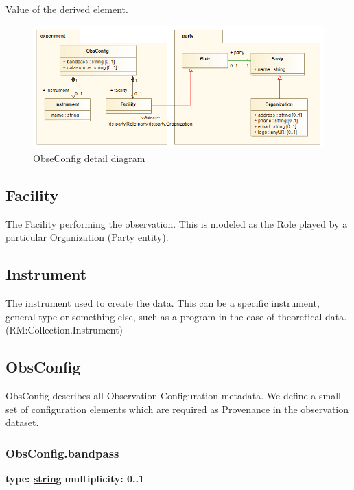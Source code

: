   Value of the derived element.

\pagebreak
\begin{figure}[h]
\begin{center}
  \includegraphics[width=5.125in]{diagrams/ObsConfig.png}
  \caption{ ObseConfig detail diagram}\label{fig:obsconfig}
\end{center}
\end{figure}
  
\subsection{Facility}
\label{sect:facility}

The Facility performing the observation. This is modeled as the Role played by
a particular Organization (Party entity).

\subsection{Instrument}
\label{sect:instrument}

The instrument used to create the data. This can be a specific instrument,
general type or something else, such as a program in the case of theoretical
data. (RM:Collection.Instrument)

\subsection{ObsConfig}
\label{sect:obsconfig}

ObsConfig describes all Observation Configuration metadata. We define a small
set of configuration elements which are required as Provenance in the
observation dataset.

  \subsubsection{ObsConfig.bandpass}
  \textbf{type: \hyperref[sect:ivoa]{string}} \newline
  \textbf{multiplicity: 0..1} \newline

